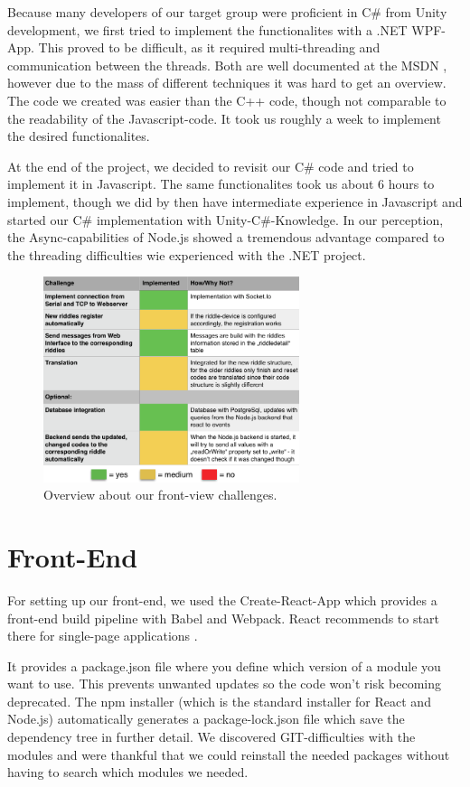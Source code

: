 Because many developers of our target group were proficient in C\# from Unity development, we first tried to implement the functionalites with a .NET WPF-App.
This proved to be difficult, as it required multi-threading and communication between the threads. Both are well documented at the MSDN \parencite{MSDN}, 
however due to the mass of different techniques it was hard to get an overview. 
The code we created was easier than the C++ code, though not comparable to the readability of the Javascript-code.
It took us roughly a week to implement the desired functionalites. 

At the end of the project, we decided to revisit our C\# code and tried to implement it in Javascript.
The same functionalites took us about 6 hours to implement, though we did by then have intermediate experience in Javascript and started our C\# implementation with Unity-C\#-Knowledge.
In our perception, the Async-capabilities of Node.js showed a tremendous advantage compared to the threading difficulties wie experienced with the .NET project.

\begin{figure}[th]
	\centering
	\includegraphics[width=75mm,scale=0.75]{Figures/backendOverview}
	\decoRule
	\caption[FrontViewTable]{Overview about our front-view challenges.}
	\label{fig:FrontViewTable}
\end{figure}

\section{Front-End}
For setting up our front-end, we used the Create-React-App which provides a front-end build pipeline with Babel and Webpack.
React recommends to start there for single-page applications \parencite{createReactApp}. 

It provides a package.json file where you define which version of a module you want to use. This prevents unwanted updates so the code won't risk becoming deprecated.
The npm installer (which is the standard installer for React and Node.js) automatically generates a package-lock.json file which save the dependency tree in further detail.
We discovered GIT-difficulties with the modules and were thankful that we could reinstall the needed packages without having to search which modules we needed.

